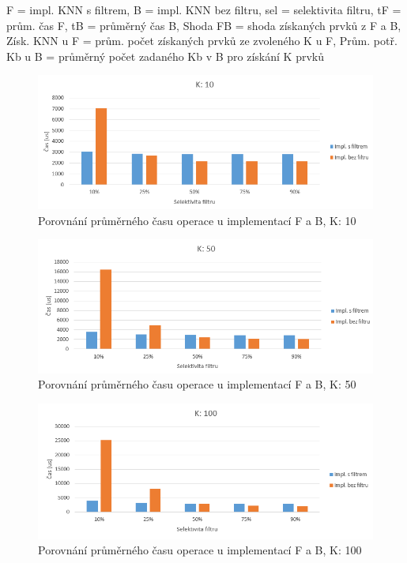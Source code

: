 \documentclass[czech,semestral,dept460,male,csharp,cpdeclaration]{diploma}
\begin{document}
\begin{center}
			{\footnotesize *F = impl. KNN s filtrem, B = impl. KNN bez filtru, sel = selektivita filtru, tF = prům. čas F, tB = průměrný čas B, Shoda FB = shoda získaných prvků z F a B, Získ. KNN u F = prům. počet získaných prvků ze zvoleného K u F, Prům. potř. Kb u B = průměrný počet zadaného Kb v B pro získání K prvků}\\
			
			
		\end{center}
		
		\label{graf_filtr_all}
		\begin{figure}
			\centering
			\includegraphics[scale=0.8]{Figures/graf_filtr_k10.png}
			\caption{Porovnání průměrného času operace u implementací F a B, K: 10}
			\label{graf_filtr_k10}
		\end{figure}
	
		\begin{figure}
			\centering
			\includegraphics[scale=0.8]{Figures/graf_filtr_k50.png}
			\caption{Porovnání průměrného času operace u implementací F a B, K: 50}
			\label{graf_filtr_k50}
		\end{figure}
	
		\begin{figure}
			\centering
			\includegraphics[scale=0.8]{Figures/graf_filtr_k100.png}
			\caption{Porovnání průměrného času operace u implementací F a B, K: 100}
			\label{graf_filtr_k100}
		\end{figure}
	
\end{document}
